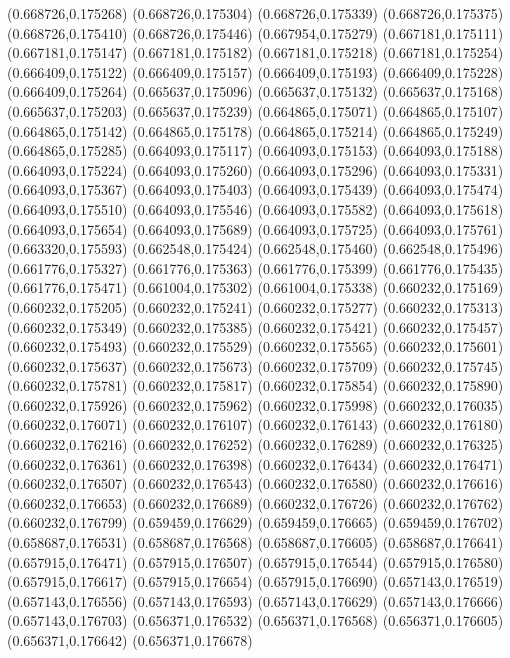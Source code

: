 (0.668726,0.175268)
(0.668726,0.175304)
(0.668726,0.175339)
(0.668726,0.175375)
(0.668726,0.175410)
(0.668726,0.175446)
(0.667954,0.175279)
(0.667181,0.175111)
(0.667181,0.175147)
(0.667181,0.175182)
(0.667181,0.175218)
(0.667181,0.175254)
(0.666409,0.175122)
(0.666409,0.175157)
(0.666409,0.175193)
(0.666409,0.175228)
(0.666409,0.175264)
(0.665637,0.175096)
(0.665637,0.175132)
(0.665637,0.175168)
(0.665637,0.175203)
(0.665637,0.175239)
(0.664865,0.175071)
(0.664865,0.175107)
(0.664865,0.175142)
(0.664865,0.175178)
(0.664865,0.175214)
(0.664865,0.175249)
(0.664865,0.175285)
(0.664093,0.175117)
(0.664093,0.175153)
(0.664093,0.175188)
(0.664093,0.175224)
(0.664093,0.175260)
(0.664093,0.175296)
(0.664093,0.175331)
(0.664093,0.175367)
(0.664093,0.175403)
(0.664093,0.175439)
(0.664093,0.175474)
(0.664093,0.175510)
(0.664093,0.175546)
(0.664093,0.175582)
(0.664093,0.175618)
(0.664093,0.175654)
(0.664093,0.175689)
(0.664093,0.175725)
(0.664093,0.175761)
(0.663320,0.175593)
(0.662548,0.175424)
(0.662548,0.175460)
(0.662548,0.175496)
(0.661776,0.175327)
(0.661776,0.175363)
(0.661776,0.175399)
(0.661776,0.175435)
(0.661776,0.175471)
(0.661004,0.175302)
(0.661004,0.175338)
(0.660232,0.175169)
(0.660232,0.175205)
(0.660232,0.175241)
(0.660232,0.175277)
(0.660232,0.175313)
(0.660232,0.175349)
(0.660232,0.175385)
(0.660232,0.175421)
(0.660232,0.175457)
(0.660232,0.175493)
(0.660232,0.175529)
(0.660232,0.175565)
(0.660232,0.175601)
(0.660232,0.175637)
(0.660232,0.175673)
(0.660232,0.175709)
(0.660232,0.175745)
(0.660232,0.175781)
(0.660232,0.175817)
(0.660232,0.175854)
(0.660232,0.175890)
(0.660232,0.175926)
(0.660232,0.175962)
(0.660232,0.175998)
(0.660232,0.176035)
(0.660232,0.176071)
(0.660232,0.176107)
(0.660232,0.176143)
(0.660232,0.176180)
(0.660232,0.176216)
(0.660232,0.176252)
(0.660232,0.176289)
(0.660232,0.176325)
(0.660232,0.176361)
(0.660232,0.176398)
(0.660232,0.176434)
(0.660232,0.176471)
(0.660232,0.176507)
(0.660232,0.176543)
(0.660232,0.176580)
(0.660232,0.176616)
(0.660232,0.176653)
(0.660232,0.176689)
(0.660232,0.176726)
(0.660232,0.176762)
(0.660232,0.176799)
(0.659459,0.176629)
(0.659459,0.176665)
(0.659459,0.176702)
(0.658687,0.176531)
(0.658687,0.176568)
(0.658687,0.176605)
(0.658687,0.176641)
(0.657915,0.176471)
(0.657915,0.176507)
(0.657915,0.176544)
(0.657915,0.176580)
(0.657915,0.176617)
(0.657915,0.176654)
(0.657915,0.176690)
(0.657143,0.176519)
(0.657143,0.176556)
(0.657143,0.176593)
(0.657143,0.176629)
(0.657143,0.176666)
(0.657143,0.176703)
(0.656371,0.176532)
(0.656371,0.176568)
(0.656371,0.176605)
(0.656371,0.176642)
(0.656371,0.176678)
